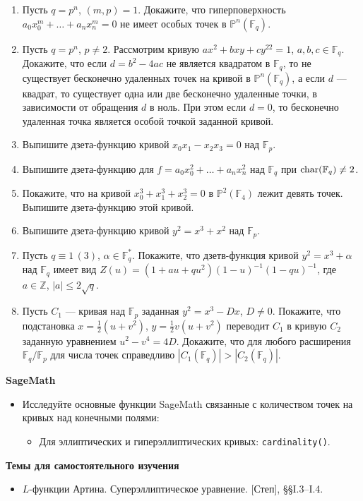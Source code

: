 \begin{enumerate}[topsep=0pt]
    \item Пусть $q=p^n$, $(m,p)=1$. Докажите, что гиперповерхность $a_0 x_0^m + \dots + a_n x_n^m=0$ не имеет особых точек в $\mathbb{P}^n(\mathbb{F}_q)$. %
    \item Пусть $q=p^n$, $p\neq 2$. Рассмотрим кривую $ax^2+bxy+cy^22=1$, $a,b,c \in \mathbb{F}_q$. Докажите, что если $d=b^2-4ac$  не является квадратом в $\mathbb{F}_q$, то не существует бесконечно удаленных точек на кривой в $\mathbb{P}^n(\mathbb{F}_q)$, а если $d$ --- квадрат, то существует одна или две бесконечно удаленные точки, в зависимости от обращения $d$ в ноль. При этом если $d=0$, то бесконечно удаленная точка является особой точкой заданной кривой. %
    \item Выпишите дзета-функцию кривой $x_0 x_1 - x_2 x_3=0$ над $\mathbb{F}_p$. %
    \item Выпишите дзета-функцию для $f = a_0 x_0^2 + \dots + a_n x_n^2$ над $\mathbb{F}_q$ при $\operatorname{char}(\mathbb{F}_q) \neq 2$. %
    \item Покажите, что на кривой $x_0^3+x_1^3+x_2^3 = 0$ в $\mathbb{P}^2(\mathbb{F}_4)$ лежит девять точек. Выпишите дзета-функцию этой кривой. %
    \item Выпишите дзета-функцию кривой $y^2=x^3+x^2$ над $\mathbb{F}_p$. %
    \item Пусть $q \equiv 1\,(3)$, $\alpha\in\mathbb{F}_q^*$. Покажите, что дзетв-функция кривой $y^2=x^3+\alpha$ над $\mathbb{F}_q$ имеет вид $Z(u) = (1+au+qu^2)(1-u)^{-1}(1-qu)^{-1}$, где $a\in\mathbb{Z}$, $|a|\leqslant 2\sqrt{q}$. %
    \item Пусть $C_1$ --- кривая над $\mathbb{F}_p$ заданная $y^2=x^3-Dx$, $D\neq 0$. Покажите, что подстановка $x=\frac{1}{2}(u+v^2)$, $y=\frac{1}{2}v(u+v^2)$ переводит $C_1$ в кривую $C_2$ заданную уравнением $u^2-v^4=4D$. Докажите, что для любого расширения $\mathbb{F}_q/\mathbb{F}_p$ для числа точек справедливо $|C_1(\mathbb{F}_q)| > |C_2(\mathbb{F}_q)|$. %
\end{enumerate}

\noindent\textbf{SageMath}
\begin{itemize}[topsep=0pt]
    \item Исследуйте основные функции SageMath связанные с количеством точек на кривых над конечными полями:
    \begin{itemize}[noitemsep,topsep=0pt]
        \item Для эллиптических и гиперэллиптических кривых: \texttt{cardinality()}.
     \end{itemize}
\end{itemize}


\noindent\textbf{Темы для самостоятельного изучения}
\begin{itemize}[topsep=0pt]
    \item $L$-функции Артина. Суперэллиптическое уравнение. [Степ], \S\S I.3--I.4.
\end{itemize}
